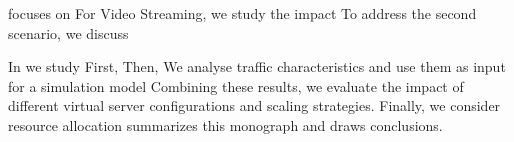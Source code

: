  focuses on
For Video Streaming, we study the impact
To address the second scenario, we discuss

In  we study
First,
Then,
We analyse traffic characteristics and use them as input for a simulation model
Combining these results, we evaluate the impact of different virtual server configurations and scaling strategies.
Finally, we consider resource allocation
 summarizes this monograph and draws conclusions.
